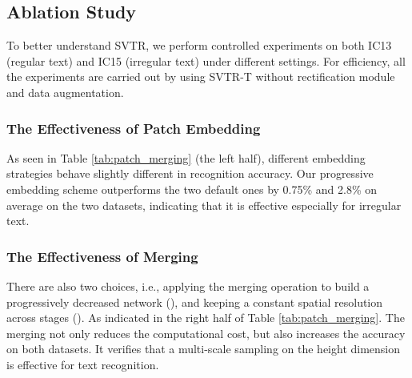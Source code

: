 \documentclass{article}
\begin{document}
\subsection{Ablation Study} \label{section:3.3}
To better understand SVTR, we perform controlled experiments on both IC13 (regular text) and IC15 (irregular text) under different settings. For efficiency, all the experiments are carried out by using SVTR-T without rectification module and data augmentation.

\subsubsection{The Effectiveness of Patch Embedding}
As seen in Table \ref{tab:patch_merging} (the left half), different embedding strategies behave slightly different in recognition accuracy. Our progressive embedding scheme outperforms the two default ones by 0.75\% and 2.8\% on average on the two datasets, indicating that it is effective especially for irregular text. 

 

\subsubsection{The Effectiveness of Merging}

There are also two choices, i.e., applying the merging operation to build a progressively decreased network (), and keeping a constant spatial resolution across stages (). As indicated in the right half of Table \ref{tab:patch_merging}. The merging not only reduces the computational cost, but also increases the accuracy on both datasets. It verifies that a multi-scale sampling on the height dimension is effective for text recognition. 


\begin{table}[t]
\centering
\subtable
{ 
}

\caption{Ablation study on patch embedding (the left half) and merging (the right half).}
\label{tab:patch_merging}
\end{table}
\end{document}

